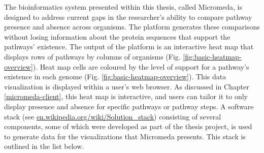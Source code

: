 The bioinformatics system presented within this thesis, called Micromeda, is 
designed to address current gaps in the researcher's ability to compare pathway 
presence and absence across organisms. The platform generates these comparisons 
without losing information about the protein sequences that support the 
pathways' existence. The output of the platform is an interactive heat map that 
displays rows of pathways by columns of organisms (Fig. 
\ref{fig:basic-heatmap-overview}). Heat map cells are coloured by the level of 
support for a pathway's existence in each genome (Fig. 
\ref{fig:basic-heatmap-overview}). This data visualization is displayed within a 
user's web browser. As discussed in Chapter \ref{micromeda-client}, this heat 
map is interactive, and users can tailor it to only display presence and absence 
for specific pathways or pathway steps. A software stack (see 
\href{http://en.wikipedia.org/wiki/Solution_stack}{en.wikipedia.org/wiki/Solution\_stack}) 
consisting of several components, some of which were developed as part of the 
thesis project, is used to generate data for the visualizations that Micromeda 
presents. This stack is outlined in the list below.


